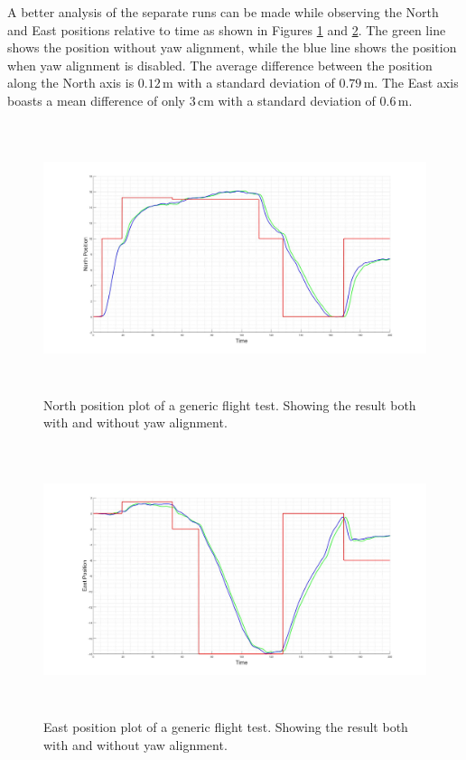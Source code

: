 		A better analysis of the separate runs can be made while observing the North and East positions relative to time as shown in Figures \ref{IM_Test46} and \ref{IM_Test47}. The green line shows the position without yaw alignment, while the blue line shows the position when yaw alignment is disabled. The average difference between the position along the North axis is $0.12$\,m with a standard deviation of $0.79$\,m. The East axis boasts a mean difference of only $3$\,cm with a standard deviation of $0.6$\,m.
		
		\begin{figure}[H]
			\centering
			\includegraphics[height = 7.9cm]{../References/Testing/FullRunBothNorth.jpg} 
			\caption{North position plot of a generic flight test. Showing the result both with and without yaw alignment.}
			\label{IM_Test46}
		\end{figure}
		
		\begin{figure}[H]
			\centering
			\includegraphics[height = 7.9cm]{../References/Testing/FullRunBothEast.jpg} 
			\caption{East position plot of a generic flight test. Showing the result both with and without yaw alignment.}
			\label{IM_Test47}
		\end{figure}
		
